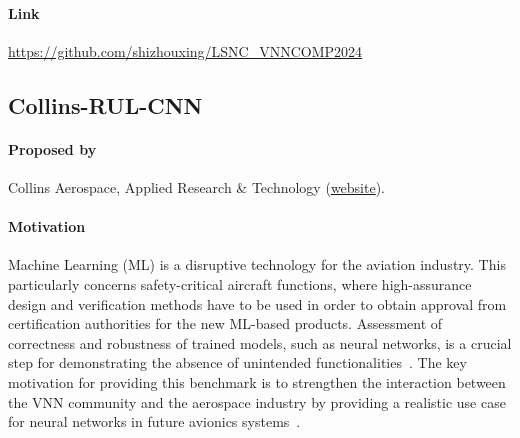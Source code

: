 \documentclass[oneside,11pt,dvipsnames]{book}
\begin{document}
\paragraph*{Link} \url{https://github.com/shizhouxing/LSNC_VNNCOMP2024}

\subsection{Collins-RUL-CNN}
\paragraph*{Proposed by} Collins Aerospace, Applied Research \& Technology (\href{https://www.collinsaerospace.com/what-we-do/capabilities/technology-and-innovation/applied-research-and-technology}{website}).

\paragraph*{Motivation} Machine Learning (ML) is a disruptive technology for the aviation industry. This particularly concerns safety-critical aircraft functions, where high-assurance design and verification methods have to be used in order to obtain approval from certification authorities for the new ML-based products. Assessment of correctness and robustness of trained models, such as neural networks, is a crucial step for demonstrating the absence of unintended functionalities~\cite{ForMuLA, kirov2023formal}. The key motivation for providing this benchmark is to strengthen the interaction between the VNN community and the aerospace industry by providing a realistic use case for neural networks in future avionics systems~\cite{kirov2023benchmark}.
\end{document}
